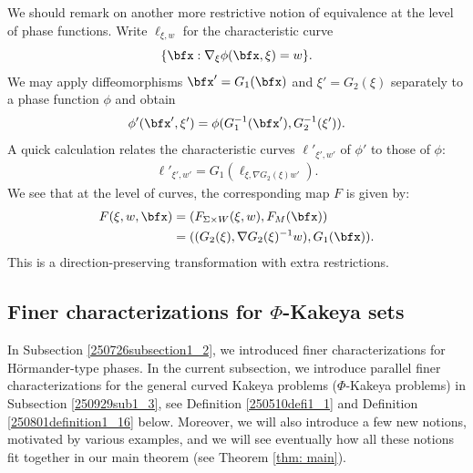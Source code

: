 \documentclass{article}
\numberwithin{equation}{section}
\theoremstyle{plain}
\begin{document}
We should remark on another more restrictive notion of equivalence at the level of phase functions. 
Write $\ell_{\xi, w}$ for the characteristic curve 
\begin{equation}
\{\bfx : \nabla_\xi \phi(\bfx,\xi)=w\}.
\end{equation}
We may apply diffeomorphisms $\bfx' = G_1(\bfx)$ and $\xi' = G_2(\xi)$ separately to a phase function $\phi$ and obtain
\begin{equation}
\phi'(\bfx', \xi') = \phi(G_1^{-1}(\bfx'), G_2^{-1}(\xi')).
\end{equation}
 A quick calculation relates the characteristic curves $\ell'_{\xi',w'}$ of $\phi'$ to those of $\phi$: 
\begin{align}
    \ell'_{\xi',w'} = G_1(\ell_{\xi, \nabla G_2(\xi) w'}). 
\end{align}
We see that at the level of curves, the corresponding map $F$ is given by: 
\begin{align}
    F(\xi, w,\bfx) &=(F_{\Sigma \times W}(\xi,w), F_M(\bfx)) \\
    &= ((G_2(\xi), \nabla G_2(\xi)^{-1} w), G_1(\bfx)).
\end{align}
This is a direction-preserving transformation with extra restrictions.








\subsection{Finer characterizations for 
\texorpdfstring{$\Phi$}{}-Kakeya sets
}



In Subsection \ref{250726subsection1_2}, we introduced finer characterizations for H\"ormander-type phases. In the current subsection, we introduce parallel finer characterizations for the general curved Kakeya problems ($\Phi$-Kakeya problems) in Subsection \ref{250929sub1_3}, see Definition \ref{250510defi1_1} and Definition \ref{250801definition1_16} below. Moreover, we will also introduce a few new notions, motivated by various examples, and we will see eventually how all these notions fit together in our main theorem (see Theorem \ref{thm: main}). 
\end{document}
